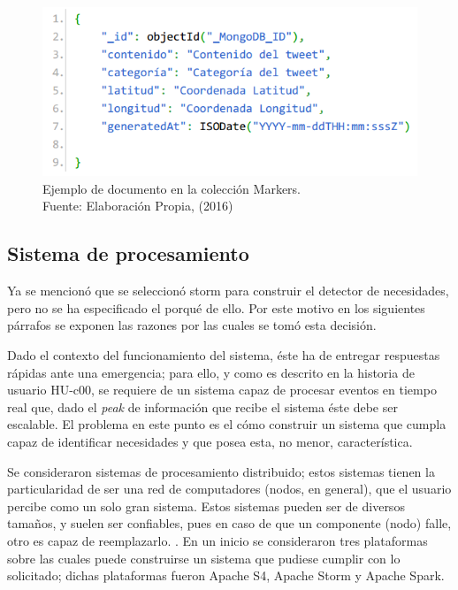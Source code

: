 \begin{figure}[H]
	\centering
	\captionsetup{justification=centering}
	\includegraphics[scale=0.8]{images/Marker1.png}
	\caption[Ejemplo de documento en la colección Markers.]{Ejemplo de documento en la colección Markers.\\Fuente: Elaboración Propia, (2016)}
	\label{fig:esquemaMarker1}
\end{figure}

\subsection{Sistema de procesamiento}
\label{sec:diseno:sistDeProce}

Ya se mencionó que se seleccionó storm para construir el detector de necesidades, pero no se ha especificado el porqué de ello. Por este motivo en los siguientes párrafos se exponen las razones por las cuales se tomó esta decisión.

Dado el contexto del funcionamiento del sistema, éste ha de entregar respuestas rápidas ante una emergencia; para ello, y como es descrito en la historia de usuario HU-c00, se requiere de un sistema capaz de procesar eventos en tiempo real que, dado el \textit{peak} de información que recibe el sistema éste debe ser escalable. El problema en este punto es el cómo construir un sistema que cumpla capaz de identificar necesidades y que posea esta, no menor, característica.

Se consideraron sistemas de procesamiento distribuido; estos sistemas tienen la particularidad de ser una red de computadores (nodos, en general), que el usuario percibe como un solo gran sistema. Estos sistemas pueden ser de diversos tamaños, y suelen ser confiables, pues en caso de que un componente (nodo) falle, otro es capaz de reemplazarlo. \cite{DefSPD}. En un inicio se consideraron tres plataformas sobre las cuales puede construirse un sistema que pudiese cumplir con lo solicitado; dichas plataformas fueron Apache S4, Apache Storm y Apache Spark.

